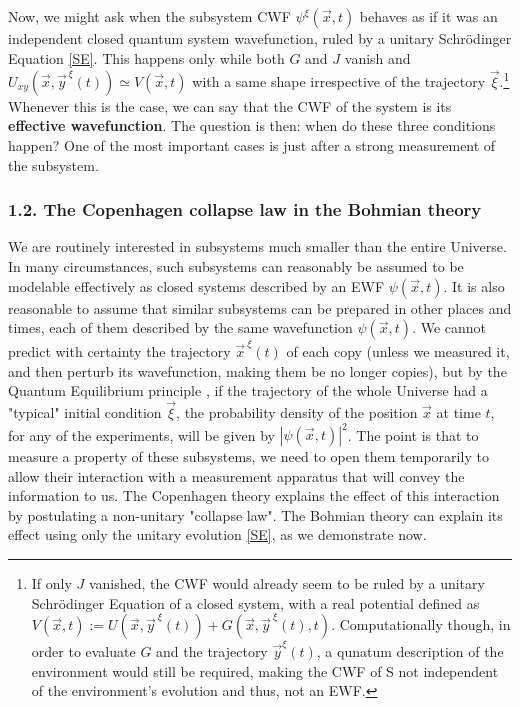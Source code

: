 \documentclass[11pt, a4paper]{article} %
\begin{document}
Now, we might ask when the subsystem CWF $\psi^\xi(\vec{x},t)$ behaves as if it was an independent closed quantum system wavefunction, ruled by a unitary Schrödinger Equation \eqref{SE}. This happens only while both $G$ and $J$ vanish and $U_{xy}(\vec{x},\vec{y}^{\,\xi}(t))\simeq V(\vec{x},t)$ with a same shape irrespective of the trajectory $\vec{\xi}$.\footnote{ If only $J$ vanished, the CWF would already seem to be ruled by a unitary Schrödinger Equation of a closed system, with a real potential defined as $V(\vec{x},t):=U(\vec{x},\vec{y}^{\:\xi}(t))+G(\vec{x},\vec{y}^{\:\xi}(t),t)$. Computationally though, in order to evaluate $G$ and the trajectory $\vec{y}^\xi(t)$, a qunatum description of the environment would still be required, making the CWF of S not independent of the environment's evolution and thus, not an EWF. } Whenever this is the case, we can say that the CWF of the system is its {\bf effective wavefunction}. The question is then: when do these three conditions happen? One of the most important cases is just after a strong measurement of the subsystem. 

\vspace{-0.2cm}

\subsubsection*{1.2. The Copenhagen collapse law in the Bohmian theory}
\vspace{-0.1cm}

We are routinely interested in subsystems much smaller than the entire Universe. In many circumstances, such subsystems can reasonably be assumed to be modelable effectively as closed systems described by an EWF $\psi(\vec{x},t)$. It is also reasonable to assume that similar subsystems can be prepared in other places and times, each of them described by the same wavefunction $\psi(\vec{x},t)$. We cannot predict with certainty the trajectory $\vec{x}^{\:\xi}(t)$ of each copy (unless we measured it, and then perturb its wavefunction, making them be no longer copies), but by the Quantum Equilibrium principle \cite{Absolute}, if the trajectory of the whole Universe had a "typical" initial condition $\vec{\xi}$, the probability density of the position $\vec{x}$ at time $t$, for any of the experiments, will be given by $|\psi(\vec{x},t)|^2$. The point is that to measure a property of these subsystems, we need to open them temporarily to allow their interaction with a measurement apparatus that will convey the information to us. The Copenhagen theory explains the effect of this interaction by postulating a non-unitary "collapse law". The Bohmian theory can explain its effect using only the unitary evolution \eqref{SE}, as we demonstrate now.
\end{document}
